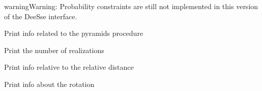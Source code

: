 \documentclass[letterpaper,10pt,english]{sphinxmanual}
\begin{document}
\begin{fulllineitems}
\begin{fulllineitems}
\begin{sphinxadmonition}{warning}{Warning:}
Probability constraints are still not implemented in 
this version of the DeeSse interface.
\end{sphinxadmonition}

\end{fulllineitems}


\begin{fulllineitems}
\label{\detokenize{appendices:s2Dcd.deesse.Param.print_pyramids}}
Print info related to the pyramids procedure

\end{fulllineitems}


\begin{fulllineitems}
\label{\detokenize{appendices:s2Dcd.deesse.Param.print_realnb}}
Print the number of realizations

\end{fulllineitems}


\begin{fulllineitems}
\label{\detokenize{appendices:s2Dcd.deesse.Param.print_reldist}}
Print info relative to the relative distance

\end{fulllineitems}


\begin{fulllineitems}
\label{\detokenize{appendices:s2Dcd.deesse.Param.print_rot}}
Print info about the rotation

\end{fulllineitems}



\end{fulllineitems}
\end{document}
